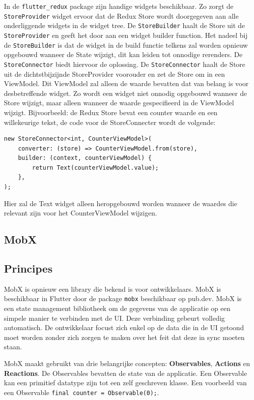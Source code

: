 In de \verb|flutter_redux| package zijn handige widgets beschikbaar. Zo zorgt de \verb|StoreProvider| widget ervoor dat de Redux Store wordt doorgegeven aan alle onderliggende widgets in de widget tree. De \verb|StoreBuilder| haalt de Store uit de \verb|StoreProvider| en geeft het door aan een widget builder function. Het nadeel bij de \verb|StoreBuilder| is dat de widget in de build functie telkens zal worden opnieuw opgebouwd wanneer de State wijzigt, dit kan leiden tot onnodige rerenders. De \verb|StoreConnector| biedt hiervoor de oplossing. De \verb|StoreConnector| haalt de Store uit de dichtstbijzijnde StoreProvider voorouder en zet de Store om in een ViewModel. Dit ViewModel zal alleen de waarde bevatten dat van belang is voor desbetreffende widget. Zo wordt een widget niet onnodig opgebouwd wanneer de Store wijzigt, maar alleen wanneer de waarde gespecifieerd in de ViewModel wijzigt. Bijvoorbeeld: de Redux Store bevat een counter waarde en een willekeurige tekst, de code voor de StoreConnecter wordt de volgende: 

\begin{verbatim}
new StoreConnector<int, CounterViewModel>(
    converter: (store) => CounterViewModel.from(store),
    builder: (context, counterViewModel) {
        return Text(counterViewModel.value);
    },
);
\end{verbatim}
Hier zal de Text widget alleen heropgebouwd worden wanneer de waardes die relevant zijn voor het CounterViewModel wijzigen.


\subsection{MobX}
\label{ch:mobx}
\subsection*{Principes}
MobX is opnieuw een library die bekend is voor ontwikkelaars. MobX is beschikbaar in Flutter door de package \verb|mobx| beschikbaar op pub.dev. MobX is een state management bibliotheek om de gegevens van de applicatie op een simpele manier te verbinden met de UI. Deze verbinding gebeurt volledig automatisch. De ontwikkelaar focust zich enkel op de data die in de UI getoond moet worden zonder zich zorgen te maken over het feit dat deze in sync moeten staan.

MobX maakt gebruikt van drie belangrijke concepten: \textbf{Observables}, \textbf{Actions} en \textbf{Reactions}.
\newline
De Observables bevatten de state van de applicatie. Een Observable kan een primitief datatype zijn tot een zelf geschreven klasse. Een voorbeeld van een Observable \verb|final counter = Observable(0);|.

